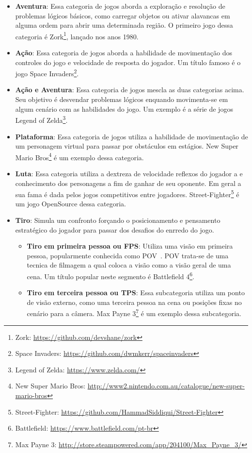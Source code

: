 \begin{itemize}
  \item \textbf{Aventura}: Essa categoria de jogos aborda a exploração e resolução de problemas lógicos básicos, como carregar objetos ou ativar alavancas em alguma ordem para abrir uma determinada região. O primeiro jogo dessa categoria é Zork\footnote{Zork: \url{https://github.com/devshane/zork}}, lançado nos anos 1980.
  \item \textbf{Ação}: Essa categoria de jogos aborda a habilidade de movimentação dos controles do jogo e velocidade de resposta do jogador. Um título famoso é o jogo Space Invaders\footnote{Space Invaders: \url{https://github.com/dwmkerr/spaceinvaders}}.
  \item \textbf{Ação e Aventura}: Essa categoria de jogos mescla as duas categorias acima. Seu objetivo é desvendar problemas lógicos enquando movimenta-se em algum cenário com as habilidades do jogo. Um exemplo é a série de jogos Legend of Zelda\footnote{Legend of Zelda: \url{https://www.zelda.com/}}.
  \item \textbf{Plataforma}: Essa categoria de jogos utiliza a habilidade de movimentação de um personagem virtual para passar por obstáculos em estágios. New Super Mario Bros\footnote{New Super Mario Bros: \url{http://www2.nintendo.com.au/catalogue/new-super-mario-bros}} é um exemplo dessa categoria.
  \item \textbf{Luta}: Essa categoria utiliza a dextreza de velocidade reflexos do jogador a e conhecimento dos personagens a fim de ganhar de seu oponente. Em geral a sua fama é dada pelos jogos competitivos entre jogadores. Street-Fighter\footnote{Street-Fighter: \url{https://github.com/HammadSiddiqui/Street-Fighter}} é um jogo OpenSource dessa categoria.
  \item \textbf{Tiro}: Simula um confronto forçando o posicionamento e pensamento estratégico do jogador para passar dos desafios do enrredo do jogo.
    \begin{itemize}
      \item \textbf{Tiro em primeira pessoa ou \ac{FPS}}: Utiliza uma visão em primeira pessoa, popularmente conhecida como \ac{POV}~\cite{pov_panix}. POV trata-se de uma tecnica de filmagem a qual coloca a visão como a visão geral de uma cena. Um título popular neste segmento é Battlefield 4\footnote{Battlefield: \url{https://www.battlefield.com/pt-br}}.
      \item \textbf{Tiro em terceira pessoa ou \ac{TPS}}: Essa subcategoria utiliza um ponto de visão externo, como uma terceira pessoa na cena ou posições fixas no cenário para a câmera. Max Payne 3\footnote{Max Payne 3: \url{http://store.steampowered.com/app/204100/Max_Payne_3/}} é um exemplo dessa subcategoria.

\end{itemize}
\end{itemize}
